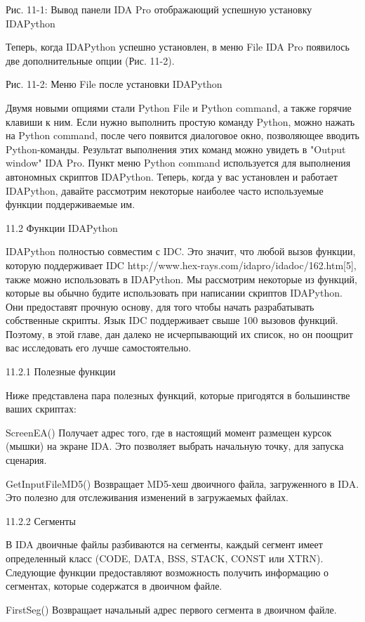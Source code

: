 \documentclass[12pt, a4paper, oneside]{book}
\begin{document}
Рис. 11-1: Вывод панели IDA Pro отображающий успешную установку IDAPython

Теперь, когда IDAPython успешно установлен, в меню File IDA Pro появилось две дополнительные опции (Рис. 11-2).


Рис. 11-2: Меню File после установки IDAPython

Двумя новыми опциями стали Python File и Python command, а также горячие клавиши к ним. Если нужно выполнить простую команду Python, можно нажать на Python command, после чего появится диалоговое окно, позволяющее вводить Python-команды. Результат выполнения этих команд можно увидеть в "Output window" IDA Pro. Пункт меню Python command используется для выполнения автономных скриптов IDAPython. Теперь, когда у вас установлен и работает IDAPython, давайте рассмотрим некоторые наиболее часто используемые функции поддерживаемые им.


11.2 Функции IDAPython

IDAPython полностью совместим с IDC. Это значит, что любой вызов функции, которую поддерживает IDC http://www.hex-rays.com/idapro/idadoc/162.htm[5], также можно использовать в IDAPython. Мы рассмотрим некоторые из функций, которые вы обычно будите использовать при написании скриптов IDAPython. Они предоставят прочную основу, для того чтобы начать разрабатывать собственные скрипты. Язык IDC поддерживает свыше 100 вызовов функций. Поэтому, в этой главе, дан далеко не исчерпывающий их список, но он поощрит вас исследовать его лучше самостоятельно.

11.2.1 Полезные функции

Ниже представлена пара полезных функций, которые пригодятся в большинстве ваших скриптах:

ScreenEA()
Получает адрес того, где в настоящий момент размещен курсок (мышки) на экране IDA. Это позволяет выбрать начальную точку, для запуска сценария.

GetInputFileMD5()
Возвращает MD5-хеш двоичного файла, загруженного в IDA. Это полезно для отслеживания изменений в загружаемых файлах.

11.2.2 Сегменты

В IDA двоичные файлы разбиваются на сегменты, каждый сегмент имеет определенный класс (CODE, DATA, BSS, STACK, CONST или XTRN). Следующие функции предоставляют возможность получить информацию о сегментах, которые содержатся в двоичном файле.

FirstSeg()
Возвращает начальный адрес первого сегмента в двоичном файле.
\end{document}
